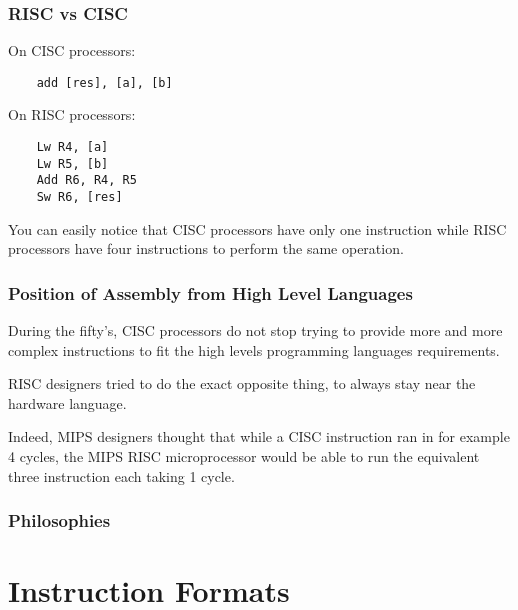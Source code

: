 
\begin{frame}[containsverbatim]
  \frametitle{RISC vs CISC}

  On CISC processors:

  \begin{verbatim}
    add [res], [a], [b]
  \end{verbatim}

  On RISC processors:

  \begin{verbatim}
    Lw R4, [a]
    Lw R5, [b]
    Add R6, R4, R5
    Sw R6, [res]
  \end{verbatim}

  You can easily notice that CISC processors have only one instruction while
  RISC processors have four instructions to perform the same operation.
\end{frame}


\begin{frame}
  \frametitle{Position of Assembly from High Level Languages}

  During the fifty's, CISC processors do not stop trying to provide
  more and more complex instructions to fit the high levels programming
  languages requirements.

  \nl

  RISC designers tried to do the exact opposite thing, to always stay
  near the hardware language.

  \nl

  Indeed, MIPS designers thought that while a CISC instruction ran in
  for example 4 cycles, the MIPS RISC microprocessor would be able to
  run the equivalent three instruction each taking 1 cycle.
\end{frame}


\begin{frame}
  \frametitle{Philosophies}

  \begin{center}
  \end{center}
\end{frame}

%
%

\section{Instruction Formats}

